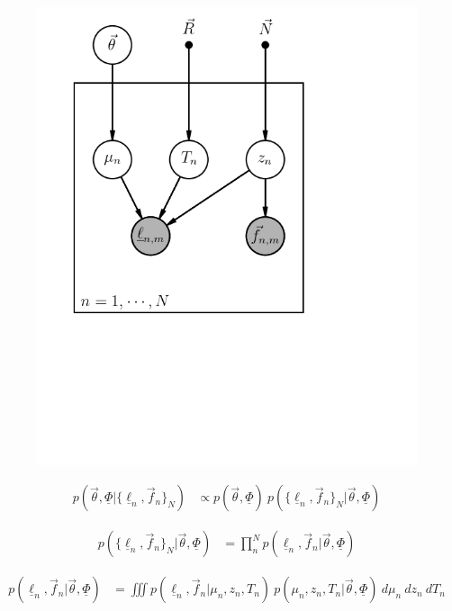 \documentclass[12pt, onecolumn]{emulateapj}
\newcommand{\textul}{\underline}
\begin{document}
\vspace{1in}
\begin{figure}
\begin{center}
\includegraphics{Hubble-draft.png}
\label{fig:pgm}
\end{center}
\end{figure}
\vspace{1in}

\begin{align}
p(\vec{\theta}, \textul{\Phi} | \{\textul{\ell}_{n}, \vec{f}_{n}\}_{N}) &\propto p(\vec{\theta}, \textul{\Phi})\ p(\{\textul{\ell}_{n}, \vec{f}_{n}\}_{N} | \vec{\theta}, \textul{\Phi})
\end{align}

\begin{align}
p(\{\textul{\ell}_{n}, \vec{f}_{n}\}_{N} | \vec{\theta}, \textul{\Phi}) &= \prod_{n}^{N}p(\textul{\ell}_{n}, \vec{f}_{n} | \vec{\theta}, \textul{\Phi})
\end{align}

\begin{align}
p(\textul{\ell}_{n}, \vec{f}_{n} | \vec{\theta}, \textul{\Phi}) &= \iiint p(\textul{\ell}_{n}, \vec{f}_{n} | \mu_{n}, z_{n}, T_{n})\ p(\mu_{n}, z_{n}, T_{n} | \vec{\theta}, \textul{\Phi})\ d\mu_{n}\ dz_{n}\ dT_{n}
\end{align}
\end{document}
